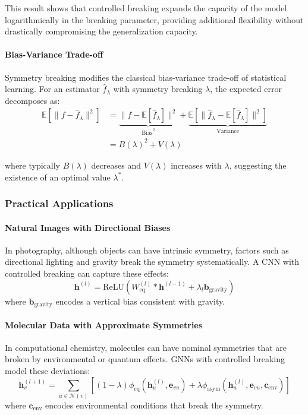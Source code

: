 This result shows that controlled breaking expands the capacity of the model logarithmically in the breaking parameter, providing additional flexibility without drastically compromising the generalization capacity.

\paragraph{Bias-Variance Trade-off}

Symmetry breaking modifies the classical bias-variance trade-off of statistical learning. For an estimator $\hat{f}_\lambda$ with symmetry breaking $\lambda$, the expected error decomposes as:
\begin{align}
\mathbb{E}[\|f - \hat{f}_\lambda\|^2] &= \underbrace{\|f - \mathbb{E}[\hat{f}_\lambda]\|^2}_{\text{Bias}^2} + \underbrace{\mathbb{E}[\|\hat{f}_\lambda - \mathbb{E}[\hat{f}_\lambda]\|^2]}_{\text{Variance}} \\
&= B(\lambda)^2 + V(\lambda)
\end{align}

where typically $B(\lambda)$ decreases and $V(\lambda)$ increases with $\lambda$, suggesting the existence of an optimal value $\lambda^*$.

\subsubsection{Practical Applications}

\paragraph{Natural Images with Directional Biases}

In photography, although objects can have intrinsic symmetry, factors such as directional lighting and gravity break the symmetry systematically. A CNN with controlled breaking can capture these effects:
\begin{equation}
\mathbf{h}^{(l)} = \text{ReLU}(W_{\text{eq}}^{(l)} * \mathbf{h}^{(l-1)} + \lambda_l \mathbf{b}_{\text{gravity}})
\end{equation}
where $\mathbf{b}_{\text{gravity}}$ encodes a vertical bias consistent with gravity.

\paragraph{Molecular Data with Approximate Symmetries}

In computational chemistry, molecules can have nominal symmetries that are broken by environmental or quantum effects. GNNs with controlled breaking model these deviations:
\begin{equation}
\mathbf{h}_v^{(l+1)} = \sum_{u \in \mathcal{N}(v)} [(1-\lambda) \phi_{\text{eq}}(\mathbf{h}_u^{(l)}, \mathbf{e}_{vu}) + \lambda \phi_{\text{asym}}(\mathbf{h}_u^{(l)}, \mathbf{e}_{vu}, \mathbf{c}_{\text{env}})]
\end{equation}
where $\mathbf{c}_{\text{env}}$ encodes environmental conditions that break the symmetry.


